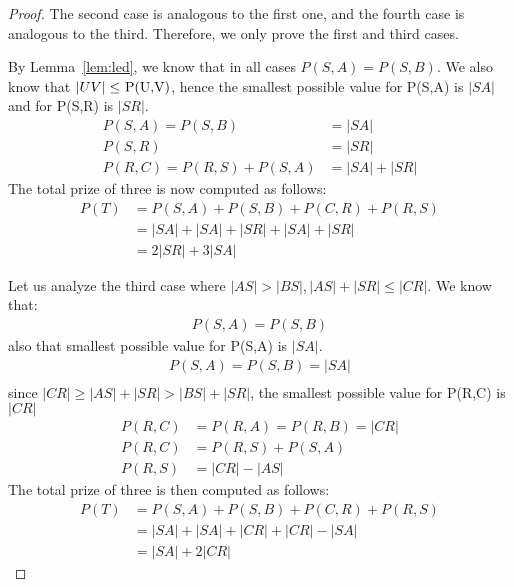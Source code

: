\documentclass[12pt]{book}
\newcommand{\Price}[2]{P(#1,#2)}
\newcommand{\Ptotal}[1]{P(#1)}
\newtheorem{proof}{Proof}
\begin{document}
	\begin{proof}
		The second case is analogous to the first one, and the fourth case is analogous to the third. Therefore, we only prove the first and third cases.
		
		By Lemma~\ref{lem:led}, we know that in all cases \( \Price{S}{A} = \Price{S}{B} \).
		We also know that \( |UV| \leq  $ \Price{U}{V}$ \), hence the smallest possible value for \Price{S}{A} is \(|SA|\) and for \Price{S}{R} is \(|SR|\).
		\begin{align*}	
			\Price{S}{A} = \Price{S}{B} &= |SA| \\
			\Price{S}{R} &= |SR| \\
			\Price{R}{C} = \Price{R}{S} + \Price{S}{A} &= |SA| + |SR|
		\end{align*}
		The total prize of three is now computed as follows:
		\begin{align*}	
			\Ptotal{T} &= \Price{S}{A} + \Price{S}{B} + \Price{C}{R} + \Price{R}{S} \\
			&= |SA| + |SA| + |SR| + |SA| + |SR| \\
			&= 2 |SR| + 3 |SA|
		\end{align*}
	
		Let us analyze the third case where \( |AS| > |BS|, |AS|+|SR| \leq |CR| \).
		We know that:
		\begin{align*}
			\Price{S}{A} = \Price{S}{B}
		\end{align*}
		also that smallest possible value for \Price{S}{A} is \(|SA|\).
		\begin{align*}	
			\Price{S}{A} = \Price{S}{B} = |SA| \\
		\end{align*}
		since \(|CR| \geq |AS|+|SR| > |BS|+|SR| \), the smallest possible value for \Price{R}{C} is \(|CR|\)
		\begin{align*}
		 	\Price{R}{C} &= \Price{R}{A} = \Price{R}{B} = |CR| \\
		 	\Price{R}{C} &= \Price{R}{S} + \Price{S}{A} \\
		 	\Price{R}{S} &= |CR| - |AS|
		\end{align*}
		The total prize of three is then computed as follows:
		\begin{align*}	
			\Ptotal{T} &= \Price{S}{A} + \Price{S}{B} + \Price{C}{R} + \Price{R}{S} \\
			&= |SA| + |SA| + |CR| + |CR| - |SA| \\
			&= |SA| + 2 |CR|
		\end{align*}
	\end{proof}	 
		 
\end{document}
